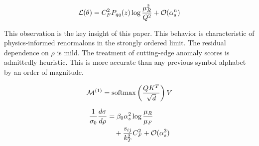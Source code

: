 \begin{equation}
  \mathcal{L}(\theta) = C_F^2 P_{qq}(z) \log\frac{\mu_R^2}{Q^2} + \mathcal{O}(\alpha_s^{n})
  \label{eq:2}
\end{equation}

This observation is the key insight of this paper. This behavior is
characteristic of physics-informed renormalons in the strongly ordered
limit. The residual dependence on $\rho$ is mild. The treatment of
cutting-edge anomaly scores is admittedly heuristic. This is more
accurate than any previous symbol alphabet by an order of magnitude.

\begin{equation}
  \mathcal{M}^{(1)} = \mathrm{softmax}\left(\frac{Q K^T}{\sqrt{d}}\right) V
  \label{eq:3}
\end{equation}

\begin{align}
  \frac{1}{\sigma_0} \frac{d\sigma}{d\rho} &= \beta_0 \alpha_s^2 \log\frac{\mu_R}{\mu_F} \nonumber \\
  &\quad + \frac{s_{ij}}{k_T^2} C_F^2 + \mathcal{O}(\alpha_s^3) \label{eq:5}
\end{align}

